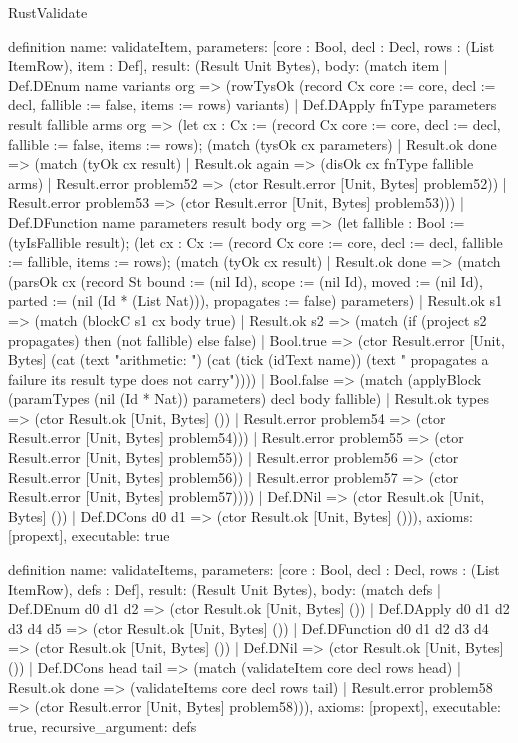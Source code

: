 \begin{lexlean}{RustValidate}
\begin{semanticmodule}
definition{
  name: validateItem,
  parameters: [core : Bool, decl : Decl, rows : (List ItemRow), item : Def],
  result: (Result Unit Bytes),
  body: (match item
    | Def.DEnum name variants org => (rowTysOk (record Cx {core := core, decl := decl, fallible := false, items := rows}) variants)
    | Def.DApply fnType parameters result fallible arms org => (let cx : Cx := (record Cx {core := core, decl := decl, fallible := false, items := rows}); (match (tysOk cx parameters)
      | Result.ok done => (match (tyOk cx result)
        | Result.ok again => (disOk cx fnType fallible arms)
        | Result.error problem52 => (ctor Result.error [Unit, Bytes] problem52))
      | Result.error problem53 => (ctor Result.error [Unit, Bytes] problem53)))
    | Def.DFunction name parameters result body org => (let fallible : Bool := (tyIsFallible result); (let cx : Cx := (record Cx {core := core, decl := decl, fallible := fallible, items := rows}); (match (tyOk cx result)
      | Result.ok done => (match (parsOk cx (record St {bound := (nil Id), scope := (nil Id), moved := (nil Id), parted := (nil (Id * (List Nat))), propagates := false}) parameters)
        | Result.ok s1 => (match (blockC s1 cx body true)
          | Result.ok s2 => (match (if (project s2 propagates) then (not fallible) else false)
            | Bool.true => (ctor Result.error [Unit, Bytes] (cat (text "arithmetic: ") (cat (tick (idText name)) (text " propagates a failure its result type does not carry"))))
            | Bool.false => (match (applyBlock (paramTypes (nil (Id * Nat)) parameters) decl body fallible)
              | Result.ok types => (ctor Result.ok [Unit, Bytes] ())
              | Result.error problem54 => (ctor Result.error [Unit, Bytes] problem54)))
          | Result.error problem55 => (ctor Result.error [Unit, Bytes] problem55))
        | Result.error problem56 => (ctor Result.error [Unit, Bytes] problem56))
      | Result.error problem57 => (ctor Result.error [Unit, Bytes] problem57))))
    | Def.DNil => (ctor Result.ok [Unit, Bytes] ())
    | Def.DCons d0 d1 => (ctor Result.ok [Unit, Bytes] ())),
  axioms: [propext],
  executable: true
}

definition{
  name: validateItems,
  parameters: [core : Bool, decl : Decl, rows : (List ItemRow), defs : Def],
  result: (Result Unit Bytes),
  body: (match defs
    | Def.DEnum d0 d1 d2 => (ctor Result.ok [Unit, Bytes] ())
    | Def.DApply d0 d1 d2 d3 d4 d5 => (ctor Result.ok [Unit, Bytes] ())
    | Def.DFunction d0 d1 d2 d3 d4 => (ctor Result.ok [Unit, Bytes] ())
    | Def.DNil => (ctor Result.ok [Unit, Bytes] ())
    | Def.DCons head tail => (match (validateItem core decl rows head)
      | Result.ok done => (validateItems core decl rows tail)
      | Result.error problem58 => (ctor Result.error [Unit, Bytes] problem58))),
  axioms: [propext],
  executable: true,
  recursive_argument: defs
}


\end{semanticmodule}
\end{lexlean}
